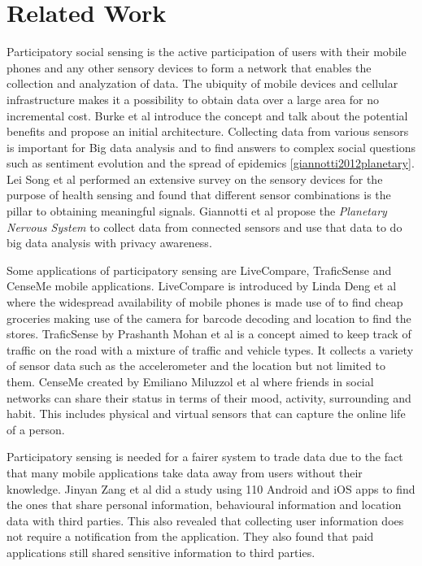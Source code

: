 \chapter{Related Work}

Participatory social sensing is the active participation of users with their mobile phones and any other sensory devices to form a network that enables the collection and analyzation of data. The ubiquity of mobile devices and cellular infrastructure makes it a possibility to obtain data over a large area for no incremental cost.
Burke et al introduce the concept \cite{burke2006participatory} and talk about the potential benefits and propose an initial architecture. Collecting data from various sensors is important for Big data analysis and to find answers to complex social questions such as sentiment evolution and the spread of epidemics \ref{giannotti2012planetary}. Lei Song et al \cite{song2014health} performed an extensive survey on the sensory devices for the purpose of health sensing and found that different sensor combinations is the pillar to obtaining meaningful signals. Giannotti et al \cite{giannotti2012planetary} propose the \textit{Planetary Nervous System} to collect data from connected sensors and use that data to do big data analysis with privacy awareness.

Some applications of participatory sensing are LiveCompare, TraficSense and CenseMe mobile applications. LiveCompare is introduced by Linda Deng et al
\cite{deng2009livecompare} where the widespread availability of mobile phones is made use of to find cheap groceries making use of the camera for barcode decoding and location to find the stores. TraficSense by Prashanth Mohan et al \cite{mohan2008nericell} is a concept aimed to keep track of traffic on the road with a mixture of traffic and vehicle types. It collects a variety of sensor data such as the accelerometer and the location but not limited to them. CenseMe created by Emiliano Miluzzol et al \cite{miluzzo2007cenceme} where friends in social networks can share their status in terms of their mood, activity, surrounding and habit. This includes physical and virtual sensors that can capture the online life of a person. 

Participatory sensing is needed for a fairer system to trade data due to the fact that many mobile applications take data away from users without their knowledge. Jinyan Zang et al
\cite{zang2015knows} did a study using 110 Android and iOS apps to find the ones that share personal information, behavioural information and location data with third parties. This also revealed that collecting user information does not require a notification from the application. They also found that paid applications still shared sensitive information to third parties. 

